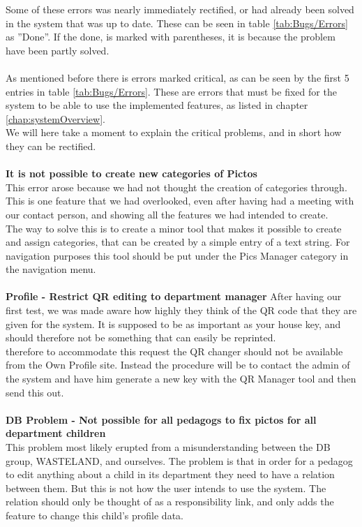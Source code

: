 Some of these errors was nearly immediately rectified, or had already been solved in the system that was up to date. These can be seen in table \ref{tab:Bugs/Errors} as ''Done''. If the done, is marked with parentheses, it is because the problem have been partly solved.\\
\\
As mentioned before there is errors marked critical, as can be seen by the first 5 entries in table \ref{tab:Bugs/Errors}. These are errors that must be fixed for the system to be able to use the implemented features, as listed in chapter \vref{chap:systemOverview}.\\
We will here take a moment to explain the critical problems, and in short how they can be rectified.\\
\\
\textbf{It is not possible to create new categories of Pictos}\\
This error arose because we had not thought the creation of categories through. This is one feature that we had overlooked, even after having had a meeting with our contact person, and showing all the features we had intended to create.\\
The way to solve this is to create a minor tool that makes it possible to create and assign categories, that can be created by a simple entry of a text string. For navigation purposes this tool should be put under the Pics Manager category in the navigation menu.\\
\\
\textbf{Profile - Restrict QR editing to department manager}
After having our first test, we was made aware how highly they think of the QR code that they are given for the system. It is supposed to be as important as your house key, and should therefore not be something that can easily be reprinted.\\
therefore to accommodate this request the QR changer should not be available from the Own Profile site. Instead the procedure will be to contact the admin of the system and have him generate a new key with the QR Manager tool and then send this out.\\
\\
\textbf{DB Problem - Not possible for all pedagogs to fix pictos for all department children}\\
This problem most likely erupted from a misunderstanding between the DB group, WASTELAND, and ourselves. The problem is that in order for a pedagog to edit anything about a child in its department they need to have a relation between them. But this is not how the user intends to use the system. The relation should only be thought of as a responsibility link, and only adds the feature to change this child’s profile data.\\
